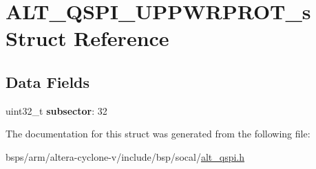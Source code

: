 \hypertarget{structALT__QSPI__UPPWRPROT__s}{}\section{A\+L\+T\+\_\+\+Q\+S\+P\+I\+\_\+\+U\+P\+P\+W\+R\+P\+R\+O\+T\+\_\+s Struct Reference}
\label{structALT__QSPI__UPPWRPROT__s}
\subsection*{Data Fields}
\begin{DoxyCompactItemize}
\item 
\mbox{\label{structALT__QSPI__UPPWRPROT__s_a691a5b07ccda4e5931079e63b54083fd}} 
uint32\+\_\+t {\bfseries subsector}\+: 32
\end{DoxyCompactItemize}


The documentation for this struct was generated from the following file\+:\begin{DoxyCompactItemize}
\item 
bsps/arm/altera-\/cyclone-\/v/include/bsp/socal/\mbox{\hyperlink{include_2bsp_2socal_2alt__qspi_8h}{alt\+\_\+qspi.\+h}}\end{DoxyCompactItemize}
